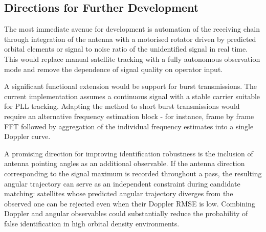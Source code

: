 \documentclass[lineno,pdflatex,sn-basic,referee,]{sn-jnl}
\begin{document}
\subsection{Directions for Further Development}
\label{subsec:future-work}

The most immediate avenue for development is automation of the receiving chain through integration of the antenna with a motorised rotator driven by predicted orbital elements or signal to noise ratio of the unidentified signal in real time. This would replace manual satellite tracking with a fully autonomous observation mode and remove the dependence of signal quality on operator input.

A significant functional extension would be support for burst transmissions. The current implementation assumes a continuous signal with a stable carrier suitable for PLL tracking. Adapting the method to short burst transmissions would require an alternative frequency estimation block - for instance, frame by frame FFT followed by aggregation of the individual frequency estimates into a single Doppler curve.

A promising direction for improving identification robustness is the inclusion of antenna pointing angles as an additional observable. If the antenna direction corresponding to the signal maximum is recorded throughout a pass, the resulting angular trajectory can serve as an independent constraint during candidate matching: satellites whose predicted angular trajectory diverges from the observed one can be rejected even when their Doppler RMSE is low. Combining Doppler and angular observables could substantially reduce the probability of false identification in high orbital density environments.
\end{document}
